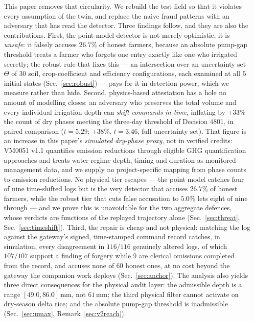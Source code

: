 This paper removes that circularity. We rebuild the test field so that it violates every assumption of the twin, and replace the
naive fraud patterns with an adversary that has read the detector. Three
findings follow, and they are also the contributions. First, the point-model
detector is not merely optimistic, it is \emph{unsafe}: it falsely accuses
$26.7\%$ of honest farmers, because an absolute pump-gap threshold treats a
farmer who forgets one entry exactly like one who irrigated secretly; the
robust rule that fixes this --- an intersection over an uncertainty set
$\Theta$ of $30$ soil, crop-coefficient and efficiency configurations, each
examined at all $5$ initial states (Sec.~\ref{sec:robust}) --- pays for it in
detection power, which we measure rather than hide. Second, physics-based attestation has a hole no amount of
modelling closes: an adversary who preserves the total volume and every
individual irrigation depth can \emph{shift commands in time}, inflating by $+33\%$ the count of dry phases
meeting the three-day threshold of Decision 4801, in paired comparison ($t=5.29$;
$+38\%$, $t=3.46$, full uncertainty set). That figure is an increase in this
paper's \emph{simulated dry-phase proxy}, not in verified credits: VM0051 v1.1
quantifies emission reductions through eligible GHG quantification approaches and
treats water-regime depth, timing and duration as monitored management data, and
we supply no project-specific mapping from phase counts to emission reductions. No
physical tier escapes --- the point model catches four of nine time-shifted logs but
is the very detector that accuses $26.7\%$ of honest farmers, while the robust
tier that cuts false accusation to $5.0\%$ lets eight of nine through --- and
we prove this is unavoidable for the two aggregate defences, whose verdicts are
functions of the replayed trajectory alone (Sec.~\ref{sec:threat},
Sec.~\ref{sec:timeshift}).
Third, the repair is cheap and not physical: matching the log against the
gateway's signed, time-stamped command record catches, in simulation, every
disagreement in
$116/116$ genuinely altered logs, of which $107/107$ support a finding of forgery
while $9$ are clerical omissions completed from the record, and accuses none of
$60$ honest ones, at no cost beyond the gateway
the companion work deploys (Sec.~\ref{sec:anchor}). The analysis also yields three direct consequences for the physical audit layer: the admissible depth is a range $[49.0,86.0]$\,mm, not $61$\,mm; the third physical filter cannot activate on dry-season delta rice; and the absolute pump-gap threshold is inadmissible
(Sec.~\ref{sec:umax}, Remark~\ref{sec:v2reach}).
